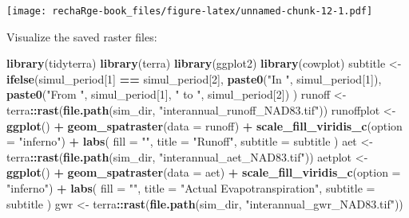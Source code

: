 \documentclass[
]{book}
\newenvironment{Shaded}{\begin{snugshade}}{\end{snugshade}}
\newcommand{\AttributeTok}[1]{\textcolor[rgb]{0.13,0.29,0.53}{#1}}
\newcommand{\DecValTok}[1]{\textcolor[rgb]{0.00,0.00,0.81}{#1}}
\newcommand{\FunctionTok}[1]{\textcolor[rgb]{0.13,0.29,0.53}{\textbf{#1}}}
\newcommand{\NormalTok}[1]{#1}
\newcommand{\OtherTok}[1]{\textcolor[rgb]{0.56,0.35,0.01}{#1}}
\newcommand{\SpecialCharTok}[1]{\textcolor[rgb]{0.81,0.36,0.00}{\textbf{#1}}}
\newcommand{\StringTok}[1]{\textcolor[rgb]{0.31,0.60,0.02}{#1}}
\begin{document}
\texttt{[image: rechaRge-book\_files/figure-latex/unnamed-chunk-12-1.pdf]}

Visualize the saved raster files:

\begin{Shaded}
\begin{Highlighting}[]
\FunctionTok{library}\NormalTok{(tidyterra)}
\FunctionTok{library}\NormalTok{(terra)}
\FunctionTok{library}\NormalTok{(ggplot2)}
\FunctionTok{library}\NormalTok{(cowplot)}
\NormalTok{subtitle }\OtherTok{\textless{}{-}} \FunctionTok{ifelse}\NormalTok{(simul\_period[}\DecValTok{1}\NormalTok{] }\SpecialCharTok{==}\NormalTok{ simul\_period[}\DecValTok{2}\NormalTok{],}
  \FunctionTok{paste0}\NormalTok{(}\StringTok{"In "}\NormalTok{, simul\_period[}\DecValTok{1}\NormalTok{]),}
  \FunctionTok{paste0}\NormalTok{(}\StringTok{"From "}\NormalTok{, simul\_period[}\DecValTok{1}\NormalTok{], }\StringTok{" to "}\NormalTok{, simul\_period[}\DecValTok{2}\NormalTok{])}
\NormalTok{)}
\NormalTok{runoff }\OtherTok{\textless{}{-}}\NormalTok{ terra}\SpecialCharTok{::}\FunctionTok{rast}\NormalTok{(}\FunctionTok{file.path}\NormalTok{(sim\_dir, }\StringTok{"interannual\_runoff\_NAD83.tif"}\NormalTok{))}
\NormalTok{runoffplot }\OtherTok{\textless{}{-}} \FunctionTok{ggplot}\NormalTok{() }\SpecialCharTok{+}
  \FunctionTok{geom\_spatraster}\NormalTok{(}\AttributeTok{data =}\NormalTok{ runoff) }\SpecialCharTok{+}
  \FunctionTok{scale\_fill\_viridis\_c}\NormalTok{(}\AttributeTok{option =} \StringTok{"inferno"}\NormalTok{) }\SpecialCharTok{+}
  \FunctionTok{labs}\NormalTok{(}
    \AttributeTok{fill =} \StringTok{""}\NormalTok{,}
    \AttributeTok{title =} \StringTok{"Runoff"}\NormalTok{,}
    \AttributeTok{subtitle =}\NormalTok{ subtitle}
\NormalTok{  )}
\NormalTok{aet }\OtherTok{\textless{}{-}}\NormalTok{ terra}\SpecialCharTok{::}\FunctionTok{rast}\NormalTok{(}\FunctionTok{file.path}\NormalTok{(sim\_dir, }\StringTok{"interannual\_aet\_NAD83.tif"}\NormalTok{))}
\NormalTok{aetplot }\OtherTok{\textless{}{-}} \FunctionTok{ggplot}\NormalTok{() }\SpecialCharTok{+}
  \FunctionTok{geom\_spatraster}\NormalTok{(}\AttributeTok{data =}\NormalTok{ aet) }\SpecialCharTok{+}
  \FunctionTok{scale\_fill\_viridis\_c}\NormalTok{(}\AttributeTok{option =} \StringTok{"inferno"}\NormalTok{) }\SpecialCharTok{+}
  \FunctionTok{labs}\NormalTok{(}
    \AttributeTok{fill =} \StringTok{""}\NormalTok{,}
    \AttributeTok{title =} \StringTok{"Actual Evapotranspiration"}\NormalTok{,}
    \AttributeTok{subtitle =}\NormalTok{ subtitle}
\NormalTok{  )}
\NormalTok{gwr }\OtherTok{\textless{}{-}}\NormalTok{ terra}\SpecialCharTok{::}\FunctionTok{rast}\NormalTok{(}\FunctionTok{file.path}\NormalTok{(sim\_dir, }\StringTok{"interannual\_gwr\_NAD83.tif"}\NormalTok{))}

\end{Highlighting}
\end{Shaded}
\end{document}
